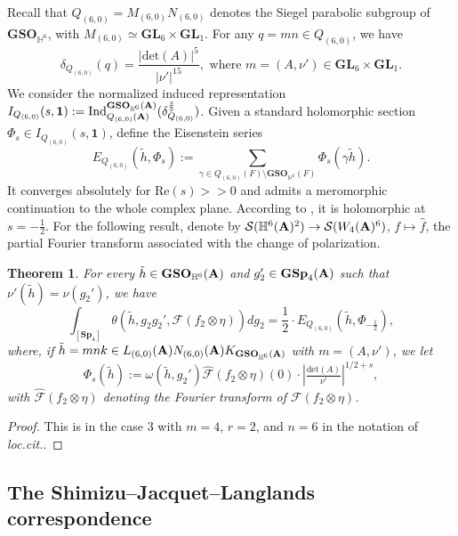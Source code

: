 \documentclass[11pt, reqno]{amsart}
\theoremstyle{plain}
\newtheorem{theorem}{Theorem}[section]
\theoremstyle{definition}
\theoremstyle{remark}
\theoremstyle{plain}
\def\A{{\bf A}}
\def\det{\mathrm{det}}
\def\GSp{{\mathbf{GSp}}}
\def\Sp{{\mathbf{Sp}}}
\def\GSO{{\mathbf{GSO}}}
\def\GL{\mathbf{GL}}
\begin{document}
Recall that $Q_{(6,0)} = M_{(6,0)}N_{(6,0)}$ denotes the Siegel parabolic subgroup of $\GSO_{\mathbb{H}^6}$, with $ M_{(6,0)} \simeq \GL_6 \times \GL_1$. For any $q = m n \in Q_{(6,0)}$, we have $$\delta_{Q_{(6,0)}}(q)=\frac{|\det(A)|^5}{|\nu'|^{15}},\text{ where $m = (A , \nu') \in \GL_6 \times \GL_1$.}$$  We consider the normalized induced representation $I_{Q_{(6,0)}}(s,\mathbf{1}) := \mathrm{Ind}_{Q_{(6,0)}(\A)}^{\GSO_{\mathbb{H}^6}(\A)}(\delta_{Q_{(6,0)}}^{\frac{s}{5}})$. Given a standard holomorphic section $\Phi_{s}\in I_{Q_{(6,0)}}(s,\mathbf{1}) $, define the Eisenstein series \[E_{Q_{(6,0)}}(\tilde{h},\Phi_{s}) := \sum_{\gamma\in Q_{(6,0)}(F)\setminus \GSO_{\mathbb{H}^6}(F)}\Phi_{s}(\gamma \tilde{h}).\]
It converges absolutely for $\mathrm{Re}(s)>>0$ and admits a meromorphic continuation to the whole complex plane. According to \cite[Theorem 2.1]{YamanaSingular}, it is holomorphic at $s = -\tfrac{1}{2}$. For the following result, denote by $\mathcal{S}(\mathbb{H}^6(\A)^2)\to \mathcal{S}(W_4(\A)^6)$, $f\mapsto \hat{f}$, the partial Fourier transform associated with the change of polarization. 
\begin{theorem}\label{SW:Sp}
    For every $\tilde{h} \in \GSO_{\mathbb{H}^6}(\A)$ and $g_2' \in \GSp_4(\A)$ such that $\nu'(\tilde{h}) = \nu(g_2')$, we have
    \[ \int_{[\Sp_4]}\theta(\tilde{h},g_2g_2',\mathcal{F}(f_2\otimes \eta))dg_2 = \frac{1}{2}\cdot E_{Q_{(6,0)}}\left(\tilde{h},\Phi_{-\frac{1}{2}}\right),\]
    where, if $\tilde{h} = mnk \in L_{(6,0)}(\A)N_{(6,0)}(\A)K_{\GSO_{\mathbb{H}^6}(\A)}$ with $m = (A,\nu')$, we let $$\Phi_{s}(\tilde{h}) := \omega(\tilde{h},g_2')\widehat{ \mathcal{F}}(f_2\otimes \eta)(0)\cdot \left|\tfrac{\mathrm{det}(A)}{\nu'}\right|^{1/2+s},$$
    with $\widehat{ \mathcal{F}}(f_2\otimes \eta)$ denoting the Fourier transform of $\mathcal{F}(f_2\otimes \eta)$.
\end{theorem}
\begin{proof}
This is \cite[Theorem 2.2 (i)]{YamanaSingular} in the case $3$ with $m = 4$, $r = 2$, and $n = 6$ in the notation of \textit{loc.cit.}.
\end{proof}

\subsection{The Shimizu--Jacquet--Langlands correspondence}
\end{document}
